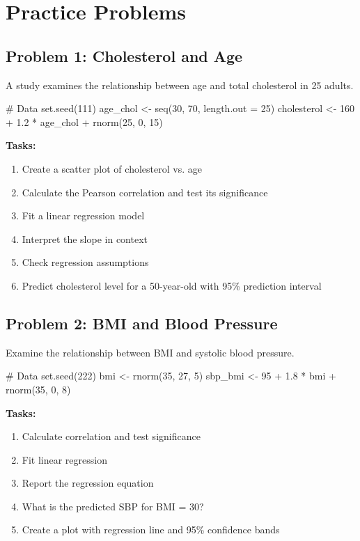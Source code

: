 \documentclass[11pt]{article}
\begin{document}
\section{Practice Problems}

\subsection{Problem 1: Cholesterol and Age}

A study examines the relationship between age and total cholesterol in 25 adults.

\begin{rcode}
# Data
set.seed(111)
age_chol <- seq(30, 70, length.out = 25)
cholesterol <- 160 + 1.2 * age_chol + rnorm(25, 0, 15)
\end{rcode}

\textbf{Tasks:}
\begin{enumerate}[label=\alph*)]
\item Create a scatter plot of cholesterol vs. age
\item Calculate the Pearson correlation and test its significance
\item Fit a linear regression model
\item Interpret the slope in context
\item Check regression assumptions
\item Predict cholesterol level for a 50-year-old with 95\% prediction interval
\end{enumerate}

\vspace{2cm}

\subsection{Problem 2: BMI and Blood Pressure}

Examine the relationship between BMI and systolic blood pressure.

\begin{rcode}
# Data
set.seed(222)
bmi <- rnorm(35, 27, 5)
sbp_bmi <- 95 + 1.8 * bmi + rnorm(35, 0, 8)
\end{rcode}

\textbf{Tasks:}
\begin{enumerate}[label=\alph*)]
\item Calculate correlation and test significance
\item Fit linear regression
\item Report the regression equation
\item What is the predicted SBP for BMI = 30?
\item Create a plot with regression line and 95\% confidence bands
\end{enumerate}
\end{document}

